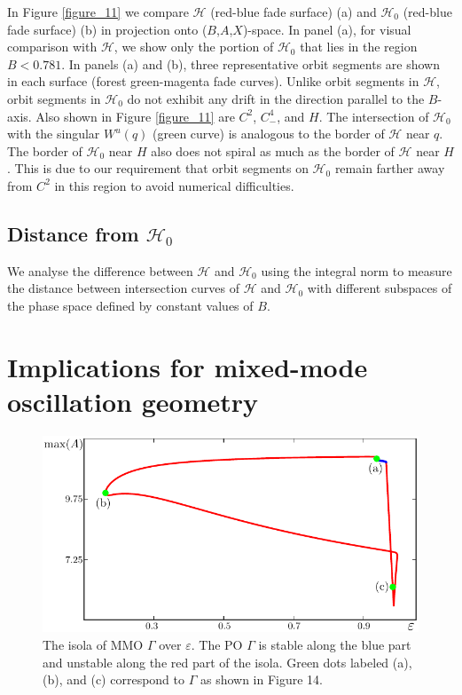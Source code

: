 \documentclass{ws-ijbc}
\begin{document}
In Figure \ref{figure_11} we compare $\mathscr{H}$ (red-blue fade surface) (a) and $\mathscr{H}_0$ (red-blue fade surface) (b) in projection onto ($B$,$A$,$X$)-space.  In panel (a), for visual comparison with $\mathscr{H}$, we show only the portion of $\mathscr{H}_0$ that lies in the region $B < 0.781$.  In panels (a) and (b), three representative orbit segments are shown in each surface (forest green-magenta fade curves).  Unlike orbit segments in $\mathscr{H}$, orbit segments in $\mathscr{H}_0$ do not exhibit any drift in the direction parallel to the $B$-axis.  Also shown in Figure \ref{figure_11} are $C^2$, $C^4_-$, and $H$.  The intersection of $\mathscr{H}_0$ with the singular $W^u(q)$ (green curve) is analogous to the border of $\mathscr{H}$ near $q$.  The border of $\mathscr{H}_0$ near $H$ also does not spiral as much as the border of $\mathscr{H}$ near $H$.  This is due to our requirement that orbit segments on $\mathscr{H}_0$ remain farther away from $C^2$ in this region to avoid numerical difficulties.

\subsection{Distance from $\mathscr{H}_0$}

We analyse the difference between $\mathscr{H}$ and $\mathscr{H}_0$ using the integral norm to measure the distance between intersection curves of $\mathscr{H}$ and $\mathscr{H}_0$ with different subspaces of the phase space defined by constant values of $B$.


\section{Implications for mixed-mode oscillation geometry}


\begin{figure}[H]
\centering
\includegraphics[]{./figures/MKMO_12.pdf}
\caption{The isola of MMO $\Gamma$ over $\varepsilon$.  The PO $\Gamma$ is stable along the blue part and unstable along the red part of the isola.  Green dots labeled (a), (b), and (c) correspond to $\Gamma$ as shown in Figure 14.}
\label{figure_12}
\end{figure}
\end{document}
